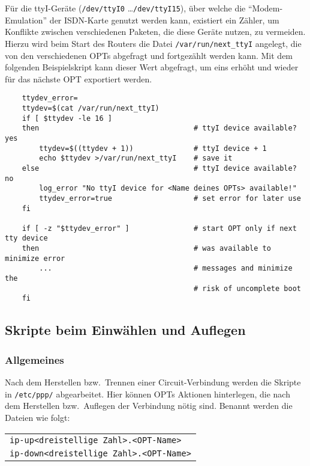 Für die ttyI-Geräte (\texttt{/dev/ttyI0} \ldots \texttt{/dev/ttyI15}), über
welche die "`Modem-Emulation"' der ISDN-Karte genutzt werden kann, existiert
ein Zähler, um Konflikte zwischen verschiedenen Paketen, die diese Geräte
nutzen, zu vermeiden.
Hierzu wird beim Start des Routers die Datei \texttt{/var/run/next\_ttyI}
angelegt, die von den verschiedenen OPTs abgefragt und fortgezählt werden kann.
Mit dem folgenden Beispielskript kann dieser Wert abgefragt, um eins
erhöht und wieder für das nächste OPT exportiert werden.

\begin{example}
\begin{verbatim}
    ttydev_error=
    ttydev=$(cat /var/run/next_ttyI)
    if [ $ttydev -le 16 ]
    then                                    # ttyI device available? yes
        ttydev=$((ttydev + 1))              # ttyI device + 1
        echo $ttydev >/var/run/next_ttyI    # save it
    else                                    # ttyI device available? no
        log_error "No ttyI device for <Name deines OPTs> available!"
        ttydev_error=true                   # set error for later use
    fi

    if [ -z "$ttydev_error" ]               # start OPT only if next tty device
    then                                    # was available to minimize error
        ...                                 # messages and minimize the
                                            # risk of uncomplete boot
    fi
\end{verbatim}
\end{example}

\subsection{Skripte beim Einwählen und Auflegen}

\subsubsection{Allgemeines}

Nach dem Herstellen bzw.\ Trennen einer Circuit-Verbindung werden die Skripte
in \texttt{/etc/ppp/} abgearbeitet. Hier können OPTs Aktionen hinterlegen,
die nach dem Herstellen bzw.\ Auflegen der Verbindung nötig
sind. Benannt werden die Dateien wie folgt:

\begin{table}[htbp]
\centering
\begin{tabular}{l}
    \texttt{ip-up<dreistellige Zahl>.<OPT-Name>}\\
    \texttt{ip-down<dreistellige Zahl>.<OPT-Name>}\\
\end{tabular}
\end{table}

